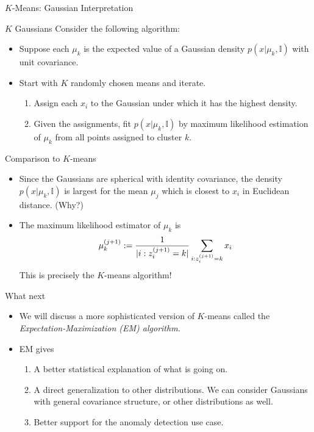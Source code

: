 \documentclass[10pt]{beamer}
\newcommand{\assign}{z} %
\begin{document}
\begin{frame}{$K$-Means: Gaussian Interpretation}
	\scriptsize
\begin{sblock}{$K$ Gaussians}
Consider the following algorithm:
\begin{itemize}
\item Suppose each $\mu_k$ is the expected value of a Gaussian density $p(x|\mu_k, \mathbb{I})$ with unit covariance.  
\item Start with $K$ randomly chosen means and iterate.
	\begin{enumerate}
	\scriptsize
	\item Assign each $x_i$ to the Gaussian under which it has the highest density.
	\item Given the assignments, fit $p(x|\mu_k, \mathbb{I})$ by maximum likelihood estimation of $\mu_k$ from all points assigned to cluster $k$.
	\end{enumerate}
\end{itemize}
\end{sblock}

\begin{sblock}{Comparison to $K$-means}
\begin{itemize}
	\scriptsize
\item Since the Gaussians are spherical with identity covariance, the density $p(x|\mu_k, \mathbb{I})$  is largest for the mean $\mu_j$ which is closest to $x_i$ in Euclidean distance.  \tiny (Why?) \scriptsize
\item The maximum likelihood estimator of $\mu_k$ is 
	\[ \mu_k^{(j+1)} := \df{1}{|i : \assign_i^{(j+1)} = k |}  \ds\sum_{i : \assign_i^{(j+1)} = k} x_i\]
	This is precisely the $K$-means algorithm!
\end{itemize}

\end{sblock}
\end{frame}

\begin{frame}{What next}
\begin{itemize}
\item We will discuss a more sophisticated version of $K$-means called the \it{Expectation-Maximization (EM) algorithm.}

\item EM gives
	\begin{enumerate}
	\item A better statistical explanation of what is going on. 
	\item A direct generalization to other distributions.  We can consider Gaussians with general covariance structure, or other distributions as well.
    \item Better support for the anomaly detection use case.
	\end{enumerate}
\end{itemize}

\end{frame}
\end{document}
